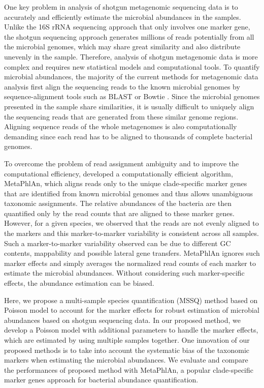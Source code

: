 One key problem in analysis of shotgun metagenomic sequencing data is to accurately and efficiently estimate the microbial abundances in the samples. Unlike the 16S rRNA sequencing approach that only involves one marker gene, the shotgun sequencing approach generates millions of reads potentially from all the microbial genomes, which may share great similarity and also distribute unevenly in the sample. Therefore, analysis of shotgun metagenomic data is more complex and requires new statistical models and computational tools. To quantify microbial abundances, the majority of the current methods for metagenomic data analysis first align the sequencing reads to the known microbial genomes by sequence-alignment tools such as BLAST \citep{altschul1990basic} or Bowtie \citep{Langmead:2009wk}. Since the microbial genomes presented in the sample share similarities, it is usually difficult to uniquely align the sequencing reads that are generated from these similar genome regions. Aligning sequence reads of the whole metagenomes is also computationally demanding since each read has to be aligned to thousands of complete bacterial genomes.

To overcome the problem of read assignment ambiguity and to improve the computational efficiency, \citet{segata2012metagenomic} developed a computationally efficient algorithm, MetaPhlAn, which aligns reads only to the unique clade-specific marker genes that are identified from known microbial genomes and thus allows unambiguous taxonomic assignments. The relative abundances of the bacteria are then quantified only by the read counts that are aligned to these marker genes. However, for a given species, we observed that the reads are not evenly aligned to the markers and this marker-to-marker variability is consistent across all samples. Such a marker-to-marker variability observed can be due to different GC contents, mappability and possible lateral gene transfers. MetaPhlAn ignores such marker effects and simply averages the normalized read counts of each marker to estimate the microbial abundances. Without considering such marker-specific effects, the abundance estimation can be biased.


Here, we propose a multi-sample species quantification (MSSQ) method based on Poisson model to account for the marker effects for robust estimation of microbial abundances based on shotgun sequencing data. In our proposed method, we develop a Poisson model with additional parameters to handle the marker effects, which are estimated by using multiple samples together. One innovation of our proposed methods is to take into account the systematic bias of the taxonomic markers when estimating the microbial abundances. We evaluate and compare the performances of proposed method with MetaPhlAn, a popular clade-specific marker genes approach for bacterial abundance quantification.




